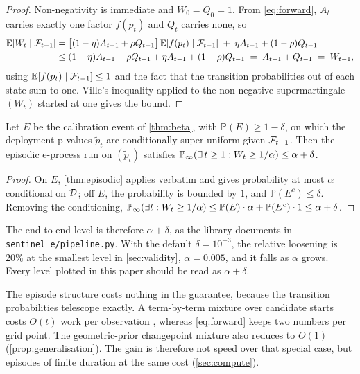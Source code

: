 \begin{proof}
Non-negativity is immediate and $W_0 = Q_0 = 1$. From \cref{eq:forward},
$A_{t}$ carries exactly one factor $f(p_t)$ and $Q_t$ carries none, so
\begin{align*}
  \mathbb{E}[W_t \mid \mathcal{F}_{t-1}]
   &= \bigl[(1-\eta)A_{t-1} + \rho Q_{t-1}\bigr]\,
      \mathbb{E}[f(p_t) \mid \mathcal{F}_{t-1}]
      \;+\; \eta A_{t-1} + (1-\rho) Q_{t-1} \\
   &\le (1-\eta)A_{t-1} + \rho Q_{t-1} + \eta A_{t-1} + (1-\rho) Q_{t-1}
    \;=\; A_{t-1} + Q_{t-1} \;=\; W_{t-1},
\end{align*}
using $\mathbb{E}[f(p_t) \mid \mathcal{F}_{t-1}] \le 1$ and the fact that the
transition probabilities out of each state sum to one. Ville's inequality
\citep{ville1939} applied to the non-negative supermartingale $(W_t)$ started at
one gives the bound.
\end{proof}

\begin{corollary}
\label{cor:composition}
Let $E$ be the calibration event of \cref{thm:beta}, with
$\mathbb{P}(E) \ge 1 - \delta$, on which the deployment p-values $\tilde p_t$
are conditionally super-uniform given $\mathcal{F}_{t-1}$. Then the episodic
e-process run on $(\tilde p_t)$ satisfies
$\mathbb{P}_{\infty}(\exists\, t \ge 1 : W_t \ge 1/\alpha) \le \alpha + \delta$.
\end{corollary}
\begin{proof}
On $E$, \cref{thm:episodic} applies verbatim and gives probability at most
$\alpha$ conditional on $\mathcal{D}$; off $E$, the probability is bounded by $1$, and
$\mathbb{P}(E^c) \le \delta$. Removing the conditioning,
$\mathbb{P}_{\infty}(\exists t : W_t \ge 1/\alpha) \le \mathbb{P}(E)\cdot\alpha +
\mathbb{P}(E^c)\cdot 1 \le \alpha + \delta$.
\end{proof}
The end-to-end level is therefore $\alpha + \delta$, as the library documents in \texttt{sentinel\_e/pipeline.py}. With the default $\delta = 10^{-3}$, the relative loosening is $20\%$ at the smallest level in \cref{sec:validity}, $\alpha = 0.005$, and it falls as $\alpha$ grows. Every level plotted in this paper should be read as $\alpha + \delta$.

The episode structure costs nothing in the guarantee, because the transition probabilities telescope exactly. A term-by-term mixture over candidate starts costs $O(t)$ work per observation \citep{saha2026nonpartitioned}, whereas \cref{eq:forward} keeps two numbers per grid point. The geometric-prior changepoint mixture also reduces to $O(1)$ (\cref{prop:generalisation}). The gain is therefore not speed over that special case, but episodes of finite duration at the same cost (\cref{sec:compute}).

